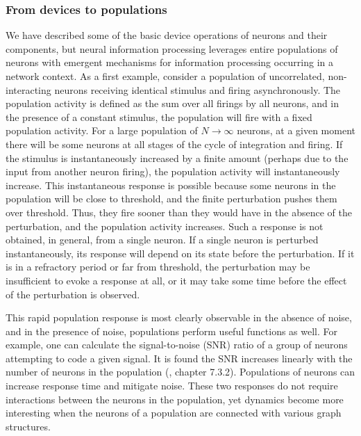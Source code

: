 \documentclass[twocolumn]{article}
\begin{document}
\subsubsection{From devices to populations}
We have described some of the basic device operations of neurons and their components, but neural information processing leverages entire populations of neurons with emergent mechanisms for information processing occurring in a network context. As a first example, consider a population of uncorrelated, non-interacting neurons receiving identical stimulus and firing asynchronously. The population activity is defined as the sum over all firings by all neurons, and in the presence of a constant stimulus, the population will fire with a fixed population activity. For a large population of $N\longrightarrow\infty$ neurons, at a given moment there will be some neurons  at all stages of the cycle of integration and firing. If the stimulus is instantaneously increased by a finite amount (perhaps due to the input from another neuron firing), the population activity will instantaneously increase. This instantaneous response is possible because some neurons in the population will be close to threshold, and the finite perturbation pushes them over threshold. Thus, they fire sooner than they would have in the absence of the perturbation, and the population activity increases. Such a response is not obtained, in general, from a single neuron. If a single neuron is perturbed instantaneously, its response will depend on its state before the perturbation. If it is in a refractory period or far from threshold, the perturbation may be insufficient to evoke a response at all, or it may take some time before the effect of the perturbation is observed.

This rapid population response is most clearly observable in the absence of noise, and in the presence of noise, populations perform useful functions as well. For example, one can calculate the signal-to-noise (SNR) ratio of a group of neurons attempting to code a given signal. It is found the SNR increases linearly with the number of neurons in the population (\cite{geki2002}, chapter 7.3.2). Populations of neurons can increase response time and mitigate noise. These two responses do not require interactions between the neurons in the population, yet dynamics become more interesting when the neurons of a population are connected with various graph structures.
\end{document}
